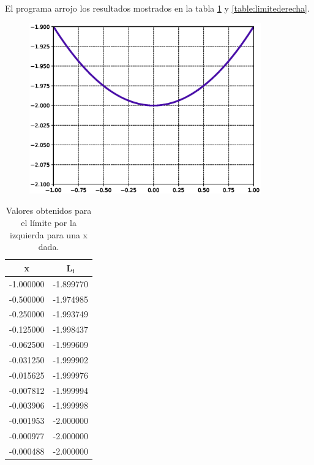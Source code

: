 El programa arrojo los resultados mostrados en la tabla \ref{table:limiteizquierda} y \ref{table:limitederecha}.
\begin{figure}[H]
    \centering
    \includegraphics[width=10cm]{Graphics/limit.eps}
    \caption{}
    \label{fig:fx2}
\end{figure}
\begin{minipage}{0.45\linewidth}
    \begin{table}[H]
        \centering
        \begin{tabular}{ll}
            \hline
            \multicolumn{1}{c}{\textbf{x}} & \multicolumn{1}{c}{$\mathbf{L_i}$} \\ \hline
            -1.000000                      & -1.899770                          \\
            -0.500000                      & -1.974985                          \\
            -0.250000                      & -1.993749                          \\
            -0.125000                      & -1.998437                          \\
            -0.062500                      & -1.999609                          \\
            -0.031250                      & -1.999902                          \\
            -0.015625                      & -1.999976                          \\
            -0.007812                      & -1.999994                          \\
            -0.003906                      & -1.999998                          \\
            -0.001953                      & -2.000000                          \\
            -0.000977                      & -2.000000                          \\
            -0.000488                      & -2.000000                          \\ \hline
        \end{tabular}
        \caption{Valores obtenidos para el límite por la izquierda para una x dada.}
        \label{table:limiteizquierda}
    \end{table}
\end{minipage}
